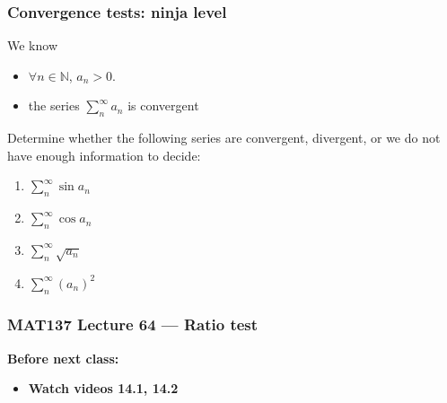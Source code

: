 \documentclass[14pt]{beamer}
\newcommand{\N}{\mathbb{N}}
\begin{document}
	\begin{frame}[t]
		\frametitle{Convergence tests: ninja level}

		We know
		\begin{itemize}
			\item ${\displaystyle \forall n \in \N}$, ${\displaystyle a_n > 0}$.

			\item the series ${\displaystyle \sum_n^{\infty} a_n }$ is convergent
		\end{itemize}

		Determine whether the following series are convergent, divergent, or we do not
		have enough information to decide:
		\begin{multicols}{2}
			\begin{enumerate}
				\item ${\displaystyle \sum_n^{\infty} \sin a_n}$

				\item ${\displaystyle \sum_n^{\infty} \cos a_n}$

				\item ${\displaystyle \sum_n^{\infty} \sqrt{a_{n}}}$

				\item ${\displaystyle \sum_n^{\infty} \left( a_n \right)^2}$
			\end{enumerate}
		\end{multicols}
	\end{frame}











\begin{frame}
	\frametitle{MAT137 Lecture 64 --- Ratio test }

	\vfill
	{\bf Before next class:}
		\begin{itemize} \normalsize
			\item {\bf Watch videos  14.1, 14.2 }
		\end{itemize}
\end{frame}
\end{document}
